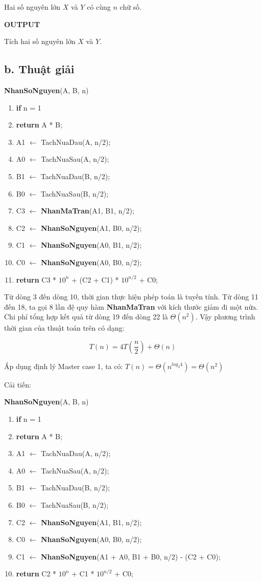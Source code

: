 \documentclass[12pt, a4paper, fleqn]{article}
\begin{document}
	Hai số nguyên lớn $X$ và $Y$ có cùng $n$ chữ số.
	
	\textbf{OUTPUT}
	
	Tích hai số nguyên lớn $X$ và $Y$.
	
	\subsection*{b. Thuật giải}
	{  \selectfont
		\textbf{NhanSoNguyen}(A, B, n)
		\begin{enumerate}
			\item \textbf{if} n = 1
			\item \qquad \textbf{return} A * B;
			\item A1 $\leftarrow$ TachNuaDau(A, n/2);
			\item A0 $\leftarrow$ TachNuaSau(A, n/2);
			\item B1 $\leftarrow$ TachNuaDau(B, n/2);
			\item B0 $\leftarrow$ TachNuaSau(B, n/2);
			\item C3 $\leftarrow$ \textbf{NhanMaTran}(A1, B1, n/2);
			\item C2 $\leftarrow$ \textbf{NhanSoNguyen}(A1, B0, n/2);
			\item C1 $\leftarrow$ \textbf{NhanSoNguyen}(A0, B1, n/2);
			\item C0 $\leftarrow$ \textbf{NhanSoNguyen}(A0, B0, n/2);
\item \textbf{return} C3 * $10^n$ + (C2 + C1) * $10^{n/2}$ + C0;
		\end{enumerate}
	}
	
	Từ dòng 3 đến dòng 10, thời gian thực hiện phép toán là tuyến tính. Từ dòng 11 đến 18, ta gọi 8 lần đệ quy hàm \textbf{NhanMaTran} với kích thước giảm đi một nửa. Chi phí tổng hợp kết quả từ dòng 19 đến dòng 22 là $\Theta (n^2)$. Vậy phương trình thời gian của thuật toán trên có dạng:
	
	$$T(n) = 4T\left(\frac{n}{2}\right) + \Theta (n)$$
	
	Áp dụng định lý Master case 1, ta có: $T(n) = \Theta (n^{log_{2} {4}}) = \Theta (n^2)$
	
	Cải tiến:
	
	{  \selectfont
		\textbf{NhanSoNguyen}(A, B, n)
		\begin{enumerate}
			\item \textbf{if} n = 1
			\item \qquad \textbf{return} A * B;
			\item A1 $\leftarrow$ TachNuaDau(A, n/2);
			\item A0 $\leftarrow$ TachNuaSau(A, n/2);
			\item B1 $\leftarrow$ TachNuaDau(B, n/2);
			\item B0 $\leftarrow$ TachNuaSau(B, n/2);
			\item C2 $\leftarrow$ \textbf{NhanSoNguyen}(A1, B1, n/2);
			\item C0 $\leftarrow$ \textbf{NhanSoNguyen}(A0, B0, n/2);
			\item C1 $\leftarrow$ \textbf{NhanSoNguyen}(A1 + A0, B1 + B0, n/2) - (C2 + C0);
			\item \textbf{return} C2 * $10^n$ + C1 * $10^{n/2}$ + C0;
		\end{enumerate}
	}
	
\end{document}
